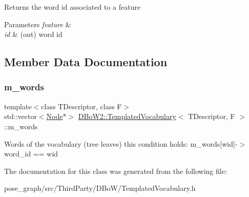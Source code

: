 Returns the word id associated to a feature 
\begin{DoxyParams}{Parameters}
{\em feature} & \\
\hline
{\em id} & (out) word id \\
\hline
\end{DoxyParams}


\subsection{Member Data Documentation}
\mbox{\label{classDBoW2_1_1TemplatedVocabulary_a1665546b54f954d2d54d59a6982df3ca}} 
\subsubsection{\texorpdfstring{m\+\_\+words}{m\_words}}
{\footnotesize\ttfamily template$<$class T\+Descriptor, class F$>$ \\
std\+::vector$<$\hyperlink{structDBoW2_1_1TemplatedVocabulary_1_1Node}{Node}$\ast$$>$ \hyperlink{classDBoW2_1_1TemplatedVocabulary}{D\+Bo\+W2\+::\+Templated\+Vocabulary}$<$ T\+Descriptor, F $>$\+::m\+\_\+words\hspace{0.3cm}{\ttfamily [protected]}}

Words of the vocabulary (tree leaves) this condition holds\+: m\+\_\+words\mbox{[}wid\mbox{]}-\/$>$word\+\_\+id == wid 

The documentation for this class was generated from the following file\+:\begin{DoxyCompactItemize}
\item 
pose\+\_\+graph/src/\+Third\+Party/\+D\+Bo\+W/Templated\+Vocabulary.\+h\end{DoxyCompactItemize}
